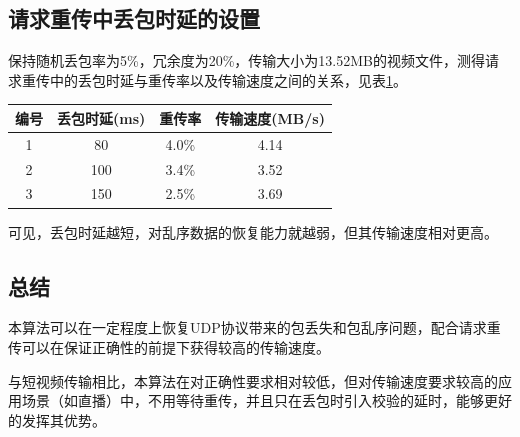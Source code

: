 \documentclass[onecolumn]{article}
\begin{document}
\begin{CJK*}{UTF8}{gbsn}
		\subsection{请求重传中丢包时延的设置}
		保持随机丢包率为5\%，冗余度为20\%，传输大小为13.52MB的视频文件，测得请求重传中的丢包时延与重传率以及传输速度之间的关系，见表\ref{table:wait_time}。
		
		\begin{table}[h]
			\centering
			\begin{tabular}{|c|c|c|c|}
				\hline 
				编号 & 丢包时延(ms) & 重传率 & 传输速度(MB/s) \\ 
				\hline 
				1 & 80 & 4.0\% & 4.14 \\ 
				\hline 
				2 & 100 & 3.4\% & 3.52 \\ 
				\hline 
				3 & 150 & 2.5\% & 3.69 \\ 
				\hline 
			\end{tabular} 
			\label{table:wait_time}
		\end{table}
		
		可见，丢包时延越短，对乱序数据的恢复能力就越弱，但其传输速度相对更高。
		
		\subsection{总结}
		本算法可以在一定程度上恢复UDP协议带来的包丢失和包乱序问题，配合请求重传可以在保证正确性的前提下获得较高的传输速度。
		
		与短视频传输相比，本算法在对正确性要求相对较低，但对传输速度要求较高的应用场景（如直播）中，不用等待重传，并且只在丢包时引入校验的延时，能够更好的发挥其优势。
		
		
	\end{CJK*}
	
\end{document}

